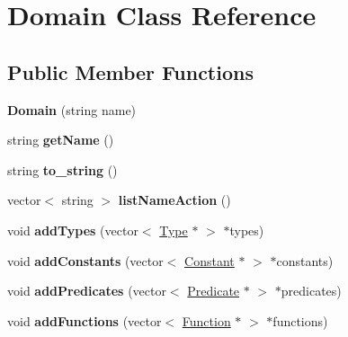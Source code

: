 \hypertarget{classDomain}{\section{Domain Class Reference}
\label{classDomain}
}
\subsection*{Public Member Functions}
\begin{DoxyCompactItemize}
\item 
\hypertarget{classDomain_a827784674b52f324840f6fbb35943d8d}{{\bfseries Domain} (string name)}\label{classDomain_a827784674b52f324840f6fbb35943d8d}

\item 
\hypertarget{classDomain_a6f65473eef928d28eeb5c6d895c27228}{string {\bfseries get\+Name} ()}\label{classDomain_a6f65473eef928d28eeb5c6d895c27228}

\item 
\hypertarget{classDomain_a15a99d1e02ec31e40e197f969b60819b}{string {\bfseries to\+\_\+string} ()}\label{classDomain_a15a99d1e02ec31e40e197f969b60819b}

\item 
\hypertarget{classDomain_a42dd052f377cc5da5027211e1bc45412}{vector$<$ string $>$ {\bfseries list\+Name\+Action} ()}\label{classDomain_a42dd052f377cc5da5027211e1bc45412}

\item 
\hypertarget{classDomain_a39e3ae01cac92c43a15df70c9d0ac615}{void {\bfseries add\+Types} (vector$<$ \hyperlink{classType}{Type} $\ast$ $>$ $\ast$types)}\label{classDomain_a39e3ae01cac92c43a15df70c9d0ac615}

\item 
\hypertarget{classDomain_a184f4457ceb65c8677379cf0b6bd9e63}{void {\bfseries add\+Constants} (vector$<$ \hyperlink{classConstant}{Constant} $\ast$ $>$ $\ast$constants)}\label{classDomain_a184f4457ceb65c8677379cf0b6bd9e63}

\item 
\hypertarget{classDomain_a517b4937d2d6b69163c0843ca3b84cf0}{void {\bfseries add\+Predicates} (vector$<$ \hyperlink{classPredicate}{Predicate} $\ast$ $>$ $\ast$predicates)}\label{classDomain_a517b4937d2d6b69163c0843ca3b84cf0}

\item 
\hypertarget{classDomain_a9f01261ab9edf08f692bff20e5af8c67}{void {\bfseries add\+Functions} (vector$<$ \hyperlink{classFunction}{Function} $\ast$ $>$ $\ast$functions)}\label{classDomain_a9f01261ab9edf08f692bff20e5af8c67}


\end{DoxyCompactItemize}
